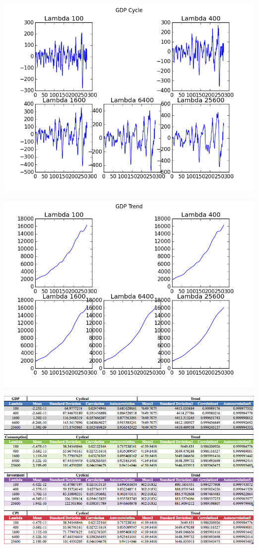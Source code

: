\documentclass[letterpaper,12pt]{article}
\theoremstyle{definition}
\begin{document}
\includegraphics[scale = .75]{elevenfive}

\includegraphics[scale = .75]{elevenfivesmooth}

\includegraphics[scale = .50]{elevenc}
\end{document}
